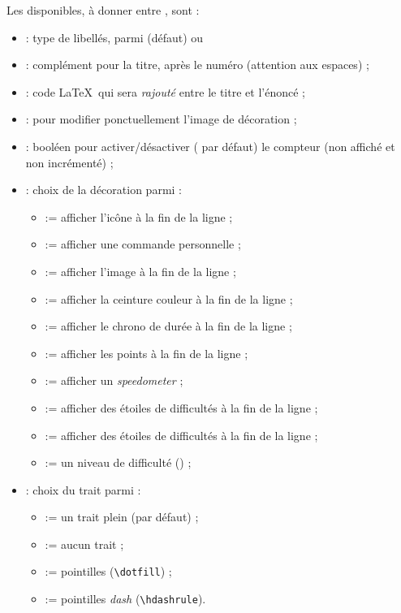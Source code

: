 \documentclass[french,11pt,a4paper]{article}
\begin{document}
Les  disponibles, à donner entre \MontreCode{[...]}, sont :

\begin{itemize}
	\item {} : type de libellés, parmi  (défaut) ou 
	\item {} : complément pour la titre, après le numéro (attention aux espaces) ;
	\item {} : code \LaTeX\ qui sera \textit{rajouté} entre le titre et l'énoncé ;
	\item {} : pour modifier ponctuellement l'image de décoration ;
	\item {} : booléen pour activer/désactiver ( par défaut) le compteur (non affiché et non incrémenté) ;
	\item {} : choix de la décoration parmi :
	\begin{itemize}
		\item {} := afficher l'icône  à la fin de la ligne ;
		\item {} := afficher une commande personnelle ;
		\item {} := afficher l'image  à la fin de la ligne ;
		\item {} := afficher la ceinture couleur  à la fin de la ligne ;
		\item {} := afficher le chrono de durée  à la fin de la ligne ;
		\item {} := afficher les points  à la fin de la ligne ;
		\item {} := afficher un \textit{speedometer} ;
		\item {} := afficher des étoiles de difficultés à la fin de la ligne ;
		\item {} := afficher des étoiles de difficultés à la fin de la ligne ;
		\item {} := un niveau de difficulté ()  ;
	\end{itemize}
	\item {} : choix du trait parmi :
	\begin{itemize}
		\item {} := un trait plein (par défaut) ;
		\item {} := aucun trait ;
		\item {} := pointilles (\texttt{\textbackslash dotfill}) ;
		\item {} := pointilles \textit{dash} (\texttt{\textbackslash hdashrule}).
	\end{itemize}
\end{itemize}
\end{document}
